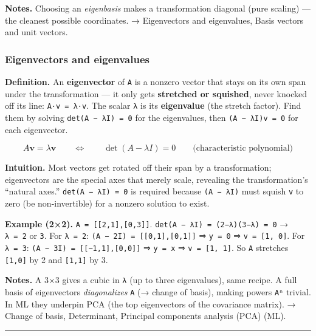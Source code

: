 \documentclass[
  10pt,
  letterpaper,
  onecolumn]{article}
\begin{document}
\textbf{Notes.} Choosing an \emph{eigenbasis} makes a transformation
diagonal (pure scaling) --- the cleanest possible coordinates. →
Eigenvectors and eigenvalues, Basis vectors and unit vectors.

\hypertarget{eigenvectors-and-eigenvalues}{%
\subsubsection{Eigenvectors and
eigenvalues}\label{eigenvectors-and-eigenvalues}}

\textbf{Definition.} An \textbf{eigenvector} of \texttt{A} is a nonzero
vector that stays on its own span under the transformation --- it only
gets \textbf{stretched or squished}, never knocked off its line:
\texttt{A·v\ =\ λ·v}. The scalar \texttt{λ} is its \textbf{eigenvalue}
(the stretch factor). Find them by solving \texttt{det(A\ −\ λI)\ =\ 0}
for the eigenvalues, then \texttt{(A\ −\ λI)v\ =\ 0} for each
eigenvector.

\begin{equation*}
A\mathbf{v}=\lambda\mathbf{v}
\qquad\Longleftrightarrow\qquad
\det(A-\lambda I)=0
\qquad\text{(characteristic polynomial)}
\end{equation*}

\textbf{Intuition.} Most vectors get rotated off their span by a
transformation; eigenvectors are the special axes that merely scale,
revealing the transformation's ``natural axes.''
\texttt{det(A\ −\ λI)\ =\ 0} is required because \texttt{(A\ −\ λI)}
must squish \texttt{v} to zero (be non-invertible) for a nonzero
solution to exist.

\textbf{Example (2×2).} \texttt{A\ =\ {[}{[}2,1{]},{[}0,3{]}{]}}.
\texttt{det(A\ −\ λI)\ =\ (2−λ)(3−λ)\ =\ 0} → \texttt{λ\ =\ 2} or
\texttt{3}. For \texttt{λ\ =\ 2}:
\texttt{(A\ −\ 2I)\ =\ {[}{[}0,1{]},{[}0,1{]}{]}} ⇒ \texttt{y\ =\ 0} ⇒
\texttt{v\ =\ {[}1,\ 0{]}}. For \texttt{λ\ =\ 3}:
\texttt{(A\ −\ 3I)\ =\ {[}{[}−1,1{]},{[}0,0{]}{]}} ⇒ \texttt{y\ =\ x} ⇒
\texttt{v\ =\ {[}1,\ 1{]}}. So \texttt{A} stretches \texttt{{[}1,0{]}}
by 2 and \texttt{{[}1,1{]}} by 3.

\textbf{Notes.} A 3×3 gives a cubic in \texttt{λ} (up to three
eigenvalues), same recipe. A full basis of eigenvectors
\emph{diagonalizes} \texttt{A} (→ change of basis), making powers
\texttt{Aⁿ} trivial. In ML they underpin PCA (the top eigenvectors of
the covariance matrix). → Change of basis, Determinant, Principal
components analysis (PCA) (ML).

\begin{center}\rule{0.5\linewidth}{0.5pt}\end{center}
\end{document}
